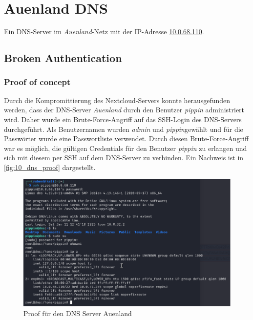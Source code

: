 \chapter{Auenland DNS}\label{sec:dns-auenland}
Ein DNS-Server im \textit{Auenland}-Netz mit der IP-Adresse \url{10.0.68.110}.\\


\section{\makecvssbadge Broken Authentication}
\subsection*{Proof of concept}
Durch die Kompromittierung des Nextcloud-Servers konnte herausgefunden werden, dass der DNS-Server \textit{Auenland} durch den Benutzer \textit{pippin} administriert wird. Daher wurde ein Brute-Force-Angriff auf das SSH-Login des DNS-Servers durchgeführt. Als Benutzernamen wurden \textit{admin} und \textit{pippin}gewählt und für die Passwörter wurde eine Passwortliste verwendet. Durch diesen Brute-Force-Angriff war es möglich, die gültigen Credentials für den Benutzer \textit{pippin} zu erlangen und sich mit diesem per SSH auf dem DNS-Server zu verbinden. Ein Nachweis ist in \autoref{fig:10_dns_proof} dargestellt.\\

\begin{figure}[!ht]
    \centering
    \includegraphics[width=\linewidth]{images/proofs/10_dns_proof.png}
    \caption{Proof für den DNS Server Auenland}
    \label{fig:10_dns_proof}
\end{figure}

